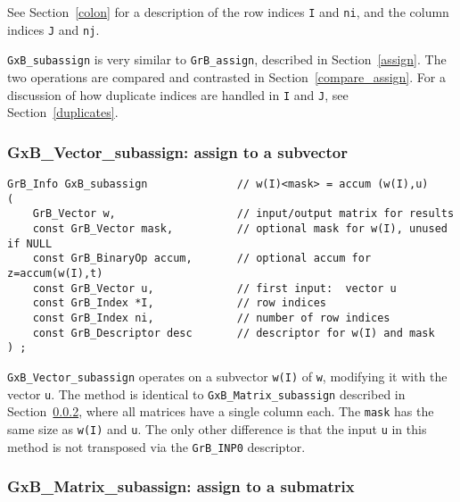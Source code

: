 \documentclass[12pt]{article}
\begin{document}
{See Section~\ref{colon} for a description of the row indices
\verb'I' and \verb'ni', and the column indices
\verb'J' and \verb'nj'.

\verb'GxB_subassign' is very similar to \verb'GrB_assign', described in
Section~\ref{assign}.  The two operations are compared and contrasted in
Section~\ref{compare_assign}.  For a discussion of how duplicate indices
are handled in \verb'I' and \verb'J', see Section~\ref{duplicates}.

\subsubsection{{\sf GxB\_Vector\_subassign:} assign to a subvector }
\label{subassign_vector}

\begin{mdframed}[userdefinedwidth=6in]
{\footnotesize
\begin{verbatim}
GrB_Info GxB_subassign              // w(I)<mask> = accum (w(I),u)
(
    GrB_Vector w,                   // input/output matrix for results
    const GrB_Vector mask,          // optional mask for w(I), unused if NULL
    const GrB_BinaryOp accum,       // optional accum for z=accum(w(I),t)
    const GrB_Vector u,             // first input:  vector u
    const GrB_Index *I,             // row indices
    const GrB_Index ni,             // number of row indices
    const GrB_Descriptor desc       // descriptor for w(I) and mask
) ;
\end{verbatim} } \end{mdframed}

\verb'GxB_Vector_subassign' operates on a subvector \verb'w(I)' of \verb'w',
modifying it with the vector \verb'u'.  The method is identical to
\verb'GxB_Matrix_subassign' described in Section~\ref{subassign_matrix}, where
all matrices have a single column each.  The \verb'mask' has the same size as
\verb'w(I)' and \verb'u'.  The only other difference is that the input \verb'u'
in this method is not transposed via the \verb'GrB_INP0' descriptor.

\newpage
\subsubsection{{\sf GxB\_Matrix\_subassign:} assign to a submatrix }
\label{subassign_matrix}

}
\end{document}
